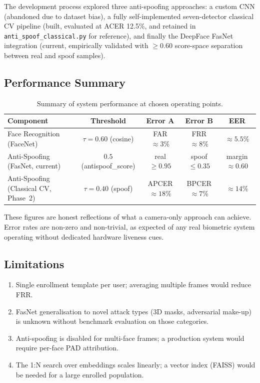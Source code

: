 \documentclass[11pt,a4paper]{article}
\begin{document}
The development process explored three anti-spoofing approaches: a custom CNN
(abandoned due to dataset bias), a fully self-implemented seven-detector classical CV
pipeline (built, evaluated at ACER 12.5\%, and retained in \texttt{anti\_spoof\_classical.py}
for reference), and finally the DeepFace FasNet integration (current, empirically
validated with $\geq 0.60$ score-space separation between real and spoof samples).

\subsection{Performance Summary}

\begin{table}[H]
\centering
\caption{Summary of system performance at chosen operating points.}
\label{tab:summary}
\renewcommand{\arraystretch}{1.2}
\begin{tabular}{@{}lcccc@{}}
\toprule
\textbf{Component} & \textbf{Threshold} & \textbf{Error A} & \textbf{Error B} & \textbf{EER} \\
\midrule
Face Recognition (FaceNet)           & $\tau=0.60$ (cosine) & FAR $\approx 3\%$    & FRR $\approx 8\%$   & $\approx 5.5\%$ \\
Anti-Spoofing (FasNet, current)      & $0.5$ (antispoof\_score) & real $\geq 0.95$ & spoof $\leq 0.35$ & margin $\approx 0.60$ \\
Anti-Spoofing (Classical CV, Phase~2) & $\tau=0.40$ (spoof)  & APCER $\approx 18\%$ & BPCER $\approx 7\%$ & $\approx 14\%$ \\
\bottomrule
\end{tabular}
\end{table}

These figures are honest reflections of what a camera-only approach can achieve.
Error rates are non-zero and non-trivial, as expected of any real biometric system
operating without dedicated hardware liveness cues.

\subsection{Limitations}

\begin{enumerate}[label=\arabic*.]
  \item Single enrollment template per user; averaging multiple frames would reduce FRR.
  \item FasNet generalisation to novel attack types (3D masks, adversarial make-up)
        is unknown without benchmark evaluation on those categories.
  \item Anti-spoofing is disabled for multi-face frames; a production system would
        require per-face PAD attribution.
  \item The 1:N search over embeddings scales linearly; a vector index (FAISS) would
        be needed for a large enrolled population.
\end{enumerate}
\end{document}
